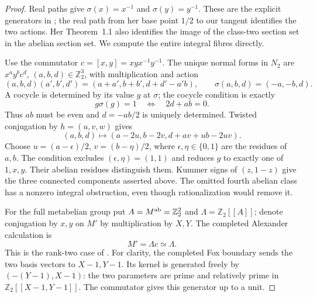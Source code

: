 \begin{proof}
Real paths give $\sigma(x)=x^{-1}$ and
$\sigma(y)=y^{-1}$. These are the explicit generators
in \citet[Example~5.6]{FA_Wickelgren2014}; the real path
from her base point $1/2$ to our tangent identifies the
two actions. Her Theorem~1.1 also identifies the image
of the class-two section set in the abelian section set.
We compute the entire integral fibres directly.

Use the commutator $c=[x,y]=xyx^{-1}y^{-1}$.
The unique normal forms in $N_2$ are $x^a y^b c^d$,
$(a,b,d)\in\mathbb Z_2^3$, with multiplication and action
\[
 (a,b,d)(a',b',d')=(a+a',b+b',d+d'-a'b),
 \qquad \sigma(a,b,d)=(-a,-b,d).
\]
A cocycle is determined by its value $g$ at $\sigma$;
the cocycle condition is exactly
\[
             g\sigma(g)=1
       \quad\Longleftrightarrow\quad 2d+ab=0.
\]
Thus $ab$ must be even and $d=-ab/2$ is uniquely
determined. Twisted conjugation by $h=(u,v,w)$ gives
\[
 (a,b,d)\longmapsto
 (a-2u,b-2v,d+av+ub-2uv).
\]
Choose $u=(a-\epsilon)/2$, $v=(b-\eta)/2$, where
$\epsilon,\eta\in\{0,1\}$ are the residues of $a,b$.
The condition excludes $(\epsilon,\eta)=(1,1)$ and
reduces $g$ to exactly one of $1,x,y$. Their abelian
residues distinguish them. Kummer signs of $(z,1-z)$
give the three connected components asserted above.
The omitted fourth abelian class has a nonzero integral
obstruction, even though rationalization would remove it.

For the full metabelian group put
$A=M^{\rm ab}=\mathbb Z_2^2$ and
$\Lambda=\mathbb Z_2[[A]]$; denote conjugation by $x,y$
on $M'$ by multiplication by $X,Y$.
The completed Alexander calculation is
\[
                 M'=\Lambda c\simeq\Lambda.
\]
This is the rank-two case of
\citet[Proposition~8 and \S5]{FA_Segal2023}.
For clarity, the completed Fox boundary sends the two
basis vectors to $X-1,Y-1$. Its kernel is generated
freely by $(-(Y-1),X-1)$: the two parameters are prime
and relatively prime in $\mathbb Z_2[[X-1,Y-1]]$.
The commutator gives this generator up to a unit.


\end{proof}
